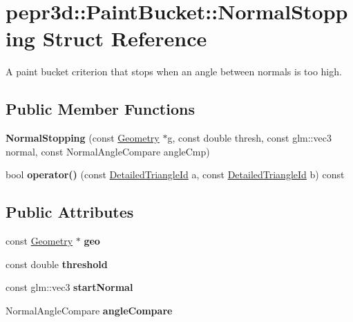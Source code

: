 \hypertarget{structpepr3d_1_1_paint_bucket_1_1_normal_stopping}{}\section{pepr3d\+::Paint\+Bucket\+::Normal\+Stopping Struct Reference}
\label{structpepr3d_1_1_paint_bucket_1_1_normal_stopping}


A paint bucket criterion that stops when an angle between normals is too high.  


\subsection*{Public Member Functions}
\begin{DoxyCompactItemize}
\item 
\mbox{\label{structpepr3d_1_1_paint_bucket_1_1_normal_stopping_a432e44cb675c28037b7a045ed547669d}} 
{\bfseries Normal\+Stopping} (const \mbox{\hyperlink{classpepr3d_1_1_geometry}{Geometry}} $\ast$g, const double thresh, const glm\+::vec3 normal, const Normal\+Angle\+Compare angle\+Cmp)
\item 
\mbox{\label{structpepr3d_1_1_paint_bucket_1_1_normal_stopping_a9d143a0bc957e837cc897c316bf5268b}} 
bool {\bfseries operator()} (const \mbox{\hyperlink{structpepr3d_1_1_detailed_triangle_id}{Detailed\+Triangle\+Id}} a, const \mbox{\hyperlink{structpepr3d_1_1_detailed_triangle_id}{Detailed\+Triangle\+Id}} b) const
\end{DoxyCompactItemize}
\subsection*{Public Attributes}
\begin{DoxyCompactItemize}
\item 
\mbox{\label{structpepr3d_1_1_paint_bucket_1_1_normal_stopping_aa5d1412d6141322da3fa57a776c0204e}} 
const \mbox{\hyperlink{classpepr3d_1_1_geometry}{Geometry}} $\ast$ {\bfseries geo}
\item 
\mbox{\label{structpepr3d_1_1_paint_bucket_1_1_normal_stopping_a1c743104c8209ec02b57b838a96f88ab}} 
const double {\bfseries threshold}
\item 
\mbox{\label{structpepr3d_1_1_paint_bucket_1_1_normal_stopping_a85815d0a0c3f538de4d9ebd2cba55a6d}} 
const glm\+::vec3 {\bfseries start\+Normal}
\item 
\mbox{\label{structpepr3d_1_1_paint_bucket_1_1_normal_stopping_acc4c4a6791bf77f208ec4ee34939488e}} 
Normal\+Angle\+Compare {\bfseries angle\+Compare}
\end{DoxyCompactItemize}


